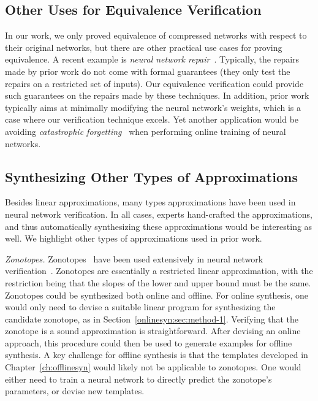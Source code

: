 \subsection{Other Uses for Equivalence Verification}
In our work, we only proved equivalence of compressed networks with
respect to their original networks, but there are other practical use cases for
proving equivalence. A recent example is \textit{neural network
repair}~\cite{yang2021neural,usman2021nn,sotoudeh2021provable,dong2021towards}.
 Typically,
the repairs made by prior work do not come with formal guarantees (they
only test the repairs on a restricted set of inputs). Our equivalence
verification could provide such guarantees on the repairs made by these
techniques. In addition, prior work typically aims at minimally modifying
the neural network's weights, which is a case where our verification
technique excels. Yet another application would be avoiding
\textit{catastrophic forgetting}~\cite{kirkpatrick2017overcoming} when
performing online training of neural networks.

\subsection{Synthesizing Other Types of Approximations}
Besides linear approximations, many types approximations have been used in
neural network verification. In all cases, experts hand-crafted the approximations, and
thus automatically synthesizing these approximations would be interesting as well. We
highlight other types of approximations used in prior work.

\textit{Zonotopes.} Zonotopes~\cite{ziegler2012lectures} have been used
extensively in neural network
verification~\cite{singh2018fast,bonaert2021fast,muller2021effective}. Zonotopes are
essentially a restricted linear approximation, with the restriction being that
the slopes of the lower and upper bound must be the same. Zonotopes could be synthesized
both online and offline. For online synthesis, one would only need to
devise a suitable linear program for synthesizing the candidate zonotope,
as in Section~\ref{onlinesyn:sec:method-1}. Verifying that the zonotope is
a sound approximation is straightforward. After devising an online
approach, this procedure could then be used to generate examples for
offline synthesis. A key challenge for offline synthesis is that the
templates developed in Chapter~\ref{ch:offlinesyn} would likely not be
applicable to zonotopes. One would either need to train a neural network to
directly predict the zonotope's parameters, or devise new templates.

